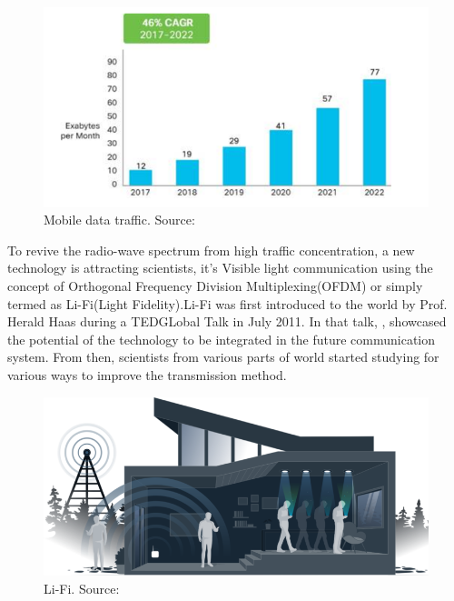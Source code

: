 \documentclass[notitlepage,hidelinks]{article}
\begin{document}
\begin{figure}[!h]
  \includegraphics{res/traffic_trend_li_fi.PNG}
    \caption{Mobile data traffic. Source: \parencite{cisco19}}
  \label{fig:traffic_trend_li_fi}
\end{figure}


To revive the radio-wave spectrum from high traffic concentration, a new
technology is attracting scientists, it's Visible light communication using the
concept of Orthogonal Frequency Division Multiplexing(OFDM) or simply termed as
Li-Fi(Light Fidelity).\newline Li-Fi was first introduced to the world by Prof.
Herald Haas during a TEDGLobal Talk in July 2011. In that talk,
\textcite{hass11}, showcased the potential of the technology to be integrated
in the future communication system. From then, scientists from various parts of
world started studying for various ways to improve the transmission method.\\

\begin{figure}[!h]
  \includegraphics[width=\linewidth]{res/tech-illustration-li-fi.png}
    \caption{Li-Fi. Source: \parencite{purelifi}}
  \label{fig:tech-illustration-li-fi}
\end{figure}
\end{document}
